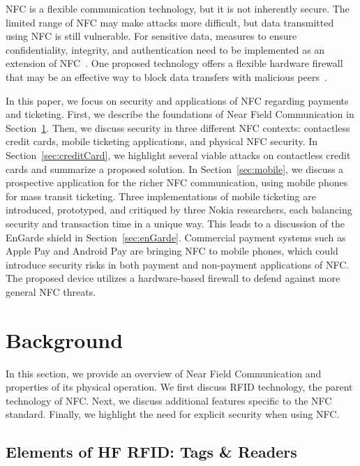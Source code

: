 \documentclass{sig-alternate}
\begin{document}
NFC is a flexible communication technology, but it is not inherently secure. The limited range of NFC may make attacks more difficult, but data transmitted using NFC is still vulnerable. For sensitive data, measures to ensure confidentiality, integrity, and authentication need to be implemented as an extension of NFC~\cite{CC2016}. One proposed technology offers a flexible hardware firewall that may be an effective way to block data transfers with malicious peers~\cite{Gum2013}.

In this paper, we focus on security and applications of NFC regarding payments and ticketing. First, we describe the foundations of Near Field Communication in Section~\ref{sec:background}. Then, we discuss security in three different NFC contexts: contactless credit cards, mobile ticketing applications, and physical NFC security.
In Section~\ref{sec:creditCard}, we highlight several viable attacks on
contactless credit cards and summarize a proposed solution.
In Section~\ref{sec:mobile}, we discuss a prospective application for the richer NFC communication, using mobile phones for mass transit ticketing. Three implementations of mobile ticketing are introduced, prototyped, and critiqued by three Nokia researchers, each balancing security and transaction time in a unique way.
This leads to a discussion of the EnGarde shield in Section~\ref{sec:enGarde}. Commercial payment systems such as Apple Pay and Android Pay are bringing NFC to mobile phones, which could introduce security risks in both payment and non-payment applications of NFC. The proposed device utilizes a hardware-based firewall to defend against more general NFC threats.


\section{Background}
\label{sec:background}
In this section, we provide an overview of Near Field Communication and properties of its physical operation.  We first discuss RFID technology, the parent technology of NFC. Next, we discuss additional features specific to the NFC standard.
Finally, we highlight the need for explicit security when using NFC.

\subsection{Elements of HF RFID: Tags \& Readers}
\label{sec:activePassive}
\end{document}
